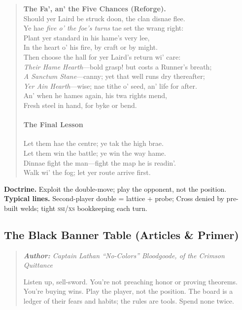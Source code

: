 \documentclass[11pt]{article}
\begin{document}
\begin{quote}
\textbf{The Fa', an' the Five Chances (Reforge).}\\
Should yer Laird be struck doon, the clan disnae flee.\\
Ye hae \emph{five o' the foe's turns} tae set the wrang right:\\
Plant yer standard in his hame's very lee,\\
In the heart o' his fire, by craft or by might.\\
Then choose the hall for yer Laird's return wi' care:\\
\quad\textit{Their Hame Hearth}—bold grasp! but costs a Runner's breath;\\
\quad\textit{A Sanctum Stane}—canny; yet that well runs dry thereafter;\\
\quad\textit{Yer Ain Hearth}—wise; nae tithe o' seed, an' life for after.\\
An' when he hames again, his twa rights mend,\\
Fresh steel in hand, for byke or bend.

\paragraph{The Final Lesson}
Let them hae the centre; ye tak the high brae.\\
Let them win the battle; ye win the way hame.\\
Dinnae fight the man—fight the map he is readin'.\\
Walk wi' the fog; let yer route arrive first.
\end{quote}

\noindent\textbf{Doctrine.} Exploit the double-move; play the opponent, not the position. \quad
\textbf{Typical lines.} Second-player double = lattice + probe; Cross denied by pre-built welds; tight \textsc{ssi}/\textsc{xs} bookkeeping each turn.

\clearpage

\subsection{The Black Banner Table (Articles \& Primer)}

\begin{quote}\small\itshape
\textbf{Author:} Captain Lathan “No-Colors” Bloodgoode, of the \emph{Crimson Quittance}

Listen up, sell-sword. You’re not preaching honor or proving theorems. You’re buying wins. Play the player, not the position. The board is a ledger of their fears and habits; the rules are tools. Spend none twice.
\end{quote}
\end{document}
